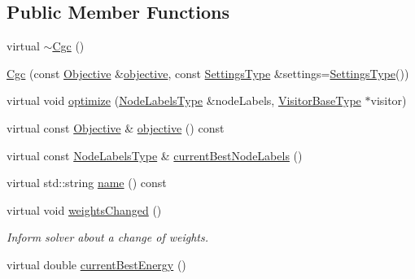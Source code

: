 \subsection*{Public Member Functions}
\begin{DoxyCompactItemize}
\item 
virtual \hyperlink{classnifty_1_1graph_1_1optimization_1_1multicut_1_1Cgc_a22509c2e989ab4f224a4caacfb54d6da}{$\sim$\+Cgc} ()
\item 
\hyperlink{classnifty_1_1graph_1_1optimization_1_1multicut_1_1Cgc_afe174dda4970687cecc6ac2ad2c94e6a}{Cgc} (const \hyperlink{classnifty_1_1graph_1_1optimization_1_1multicut_1_1Cgc_ac3e728f92d355814ff3b40b5f7d59123}{Objective} \&\hyperlink{classnifty_1_1graph_1_1optimization_1_1multicut_1_1Cgc_a926b85b4bfa4de48b4040b87f679a377}{objective}, const \hyperlink{structnifty_1_1graph_1_1optimization_1_1multicut_1_1Cgc_1_1SettingsType}{Settings\+Type} \&settings=\hyperlink{structnifty_1_1graph_1_1optimization_1_1multicut_1_1Cgc_1_1SettingsType}{Settings\+Type}())
\item 
virtual void \hyperlink{classnifty_1_1graph_1_1optimization_1_1multicut_1_1Cgc_af2cd396aefa38ad0f69bb5191954dac3}{optimize} (\hyperlink{classnifty_1_1graph_1_1optimization_1_1multicut_1_1Cgc_a2976a0116b64803813b4b0c1555a2e70}{Node\+Labels\+Type} \&node\+Labels, \hyperlink{classnifty_1_1graph_1_1optimization_1_1multicut_1_1Cgc_adb95cdb68d34774e9a3cb4990ab54ccb}{Visitor\+Base\+Type} $\ast$visitor)
\item 
virtual const \hyperlink{classnifty_1_1graph_1_1optimization_1_1multicut_1_1Cgc_ac3e728f92d355814ff3b40b5f7d59123}{Objective} \& \hyperlink{classnifty_1_1graph_1_1optimization_1_1multicut_1_1Cgc_a926b85b4bfa4de48b4040b87f679a377}{objective} () const 
\item 
virtual const \hyperlink{classnifty_1_1graph_1_1optimization_1_1multicut_1_1Cgc_a2976a0116b64803813b4b0c1555a2e70}{Node\+Labels\+Type} \& \hyperlink{classnifty_1_1graph_1_1optimization_1_1multicut_1_1Cgc_a6bece7a6c255cb25d8a99c9bcb05bbb7}{current\+Best\+Node\+Labels} ()
\item 
virtual std\+::string \hyperlink{classnifty_1_1graph_1_1optimization_1_1multicut_1_1Cgc_ab54c4448bd816fbbc4a45c2dd8e9562d}{name} () const 
\item 
virtual void \hyperlink{classnifty_1_1graph_1_1optimization_1_1multicut_1_1Cgc_a45593f369b20f4a535bc79835f7d2541}{weights\+Changed} ()
\begin{DoxyCompactList}\small\item\em Inform solver about a change of weights. \end{DoxyCompactList}\item 
virtual double \hyperlink{classnifty_1_1graph_1_1optimization_1_1multicut_1_1Cgc_ad05e02649243b645e0c4e4a23d9835b1}{current\+Best\+Energy} ()
\end{DoxyCompactItemize}


